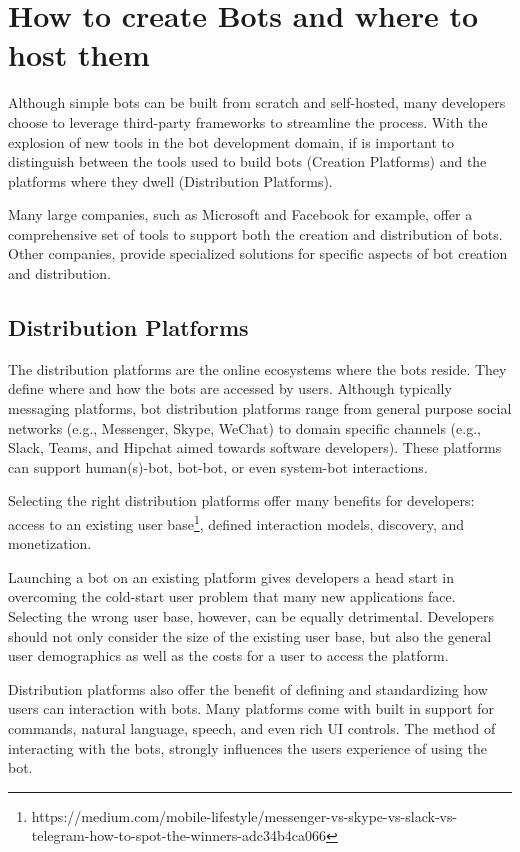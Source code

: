 \documentclass{sig-alternate}
\begin{document}
\section{How to create Bots and where to host them}

	Although simple bots can be built from scratch and self-hosted, many developers choose to leverage third-party frameworks to streamline the process. With the explosion of new tools in the bot development domain, if is important to distinguish between the tools used to build bots (Creation Platforms) and the platforms where they dwell (Distribution Platforms).

	Many large companies, such as Microsoft and Facebook for example, offer a comprehensive set of tools to support both the creation and distribution of bots. Other companies, provide specialized solutions for specific aspects of bot creation and distribution. 

	\subsection{Distribution Platforms}
	The distribution platforms are the online ecosystems where the bots reside. They define where and how the bots are accessed by users. Although typically messaging platforms, bot distribution platforms range from general purpose social networks (e.g., Messenger, Skype, WeChat) to domain specific channels (e.g., Slack, Teams, and Hipchat aimed towards software developers).  These platforms can support human(s)-bot, bot-bot, or even system-bot interactions.  

	Selecting the right distribution platforms offer many benefits for developers: access to an existing user base\footnote{https://medium.com/mobile-lifestyle/messenger-vs-skype-vs-slack-vs-telegram-how-to-spot-the-winners-adc34b4ca066\label{How_to_spot_the_winners}}, defined interaction models, discovery, and monetization.  

	Launching a bot on an existing platform gives developers a head start in overcoming the cold-start user problem that many new applications face. Selecting the wrong user base, however, can be equally detrimental. Developers should not only consider the size of the existing user base, but also the general user demographics as well as the costs for a user to access the platform. 

	Distribution platforms also offer the benefit of defining and standardizing how users can interaction with bots.  Many platforms come with built in support for commands, natural language, speech, and even rich UI controls.  The method of interacting with the bots, strongly influences the users experience of using the bot.
\end{document}
